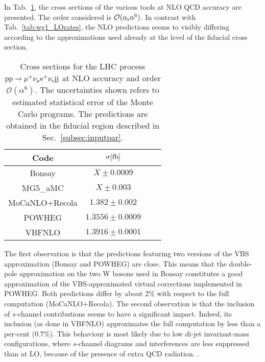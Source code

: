 In Tab.~\ref{tab:wg1_NLOrates}, the cross sections of the various tools at NLO QCD accuracy are presented.
The order considered is $\mathcal{O}(\alpha_{\rm s}\alpha^6)$.
In contrast with Tab.~\ref{tab:wg1_LOrates}, the NLO predictions seems to visibly differing according to the approximations used already at the level of the fiducial cross section.

\begin{table}[h!]
    \centering
    \begin{tabular}{c|c|c|c}
        Code  &  $\sigma[\rm{fb}]$  \\
        \hline
        \hline
        {\sc Bonsay}  &  $X \pm 0.0009$  \\
        {\sc MG5\_aMC}&  $X  \pm 0.003$  \\
        {\sc MoCaNLO+Recola}  &  $ 1.382 \pm 0.002$ \\
        {\sc POWHEG}  &  $1.3556 \pm 0.0009$  \\
        {\sc VBFNLO}  &  $1.3916 \pm 0.0001$  \\
    \end{tabular}
    \caption{\label{tab:wg1_NLOrates} Cross sections for the LHC process ${\rm p}{\rm p}\to\mu^+\nu_\mu{\rm e}^+\nu_{\rm e}{\rm j}{\rm j}$ at NLO accuracy and order $\mathcal{O}(\alpha^6)$.
    The uncertainties shown refers to estimated statistical error of the Monte Carlo programs.
    The predictions are obtained in the fiducial region described in Sec.~\ref{subsec:inputpar}.
    }
\end{table}

The first observation is that the predictions featuring two versions of the VBS approximation ({\sc Bonsay} and {\sc POWHEG}) are close.
This means that the double-pole approximation on the two W bosons used in {\sc Bonsay} constitutes a good approximation of the VBS-approximated virtual corrections implemented in {\sc POWHEG}.
Both predictions differ by about $2\%$ with respect to the full computation ({\sc MoCaNLO+Recola}).
The second observation is that the inclusion of $s$-channel contributions seems to have a significant impact.
Indeed, its inclusion (as done in {\sc VBFNLO}) approximates the full computation by less than a per-cent ($0.7\%$).
This behaviour is most likely due to low di-jet invariant-mass configurations, where $s$-channel diagrams and interferences are less suppressed than at LO, because of the presence of extra QCD radiation.
.